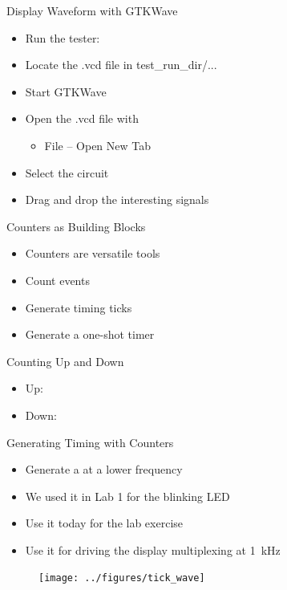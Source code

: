 \begin{frame}[fragile]{Display Waveform with GTKWave}
\begin{itemize}
\item Run the tester: 
\item Locate the .vcd file in test\_run\_dir/...
\item Start GTKWave
\item Open the .vcd file with
\begin{itemize}
\item File -- Open New Tab
\end{itemize}
\item Select the circuit
\item Drag and drop the interesting signals
\end{itemize}
\end{frame}





\begin{frame}[fragile]{Counters as Building Blocks}
\begin{itemize}
\item Counters are versatile tools
\item Count events
\item Generate timing ticks
\item Generate a one-shot timer
\end{itemize}
\end{frame}

\begin{frame}[fragile]{Counting Up and Down}
\begin{itemize}
\item Up:
\item Down:
\end{itemize}
\end{frame}

\begin{frame}[fragile]{Generating Timing with Counters}
\begin{itemize}
\item Generate a  at a lower frequency
\item We used it in Lab 1 for the blinking LED
\item Use it today for the lab exercise
\item Use it for driving the display multiplexing at 1~kHz
\end{itemize}
\begin{figure}
  \texttt{[image: ../figures/tick\_wave]}
\end{figure}
\end{frame}


